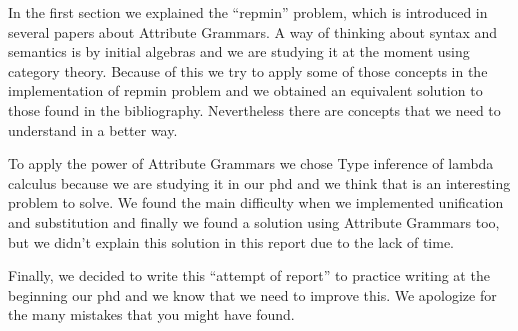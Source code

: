 \documentclass[a4paper,10pt]{article}
\begin{document}
  In the first section we explained the ``repmin'' problem, which is introduced in several papers
  about Attribute Grammars. A way of thinking about syntax and semantics is by initial algebras and
  we are studying it at the moment using category theory. Because of this we try to apply
  some of those concepts in the implementation of repmin problem and we obtained an equivalent 
  solution to those found in the bibliography. Nevertheless there are concepts that we need
  to understand in a better way.
  
  To apply the power of Attribute Grammars we chose Type inference of lambda calculus because we
  are studying it in our phd and we think that is an interesting problem to solve. We found the main difficulty
  when we implemented unification and substitution and finally we found a solution using Attribute Grammars too,
  but we didn't explain this solution in this report due to the lack of time.
  
  Finally, we decided to write this ``attempt of report'' to practice writing at the beginning our phd and we know
  that we need to improve this. We apologize for the many mistakes that you might have found.
  
\end{document}
